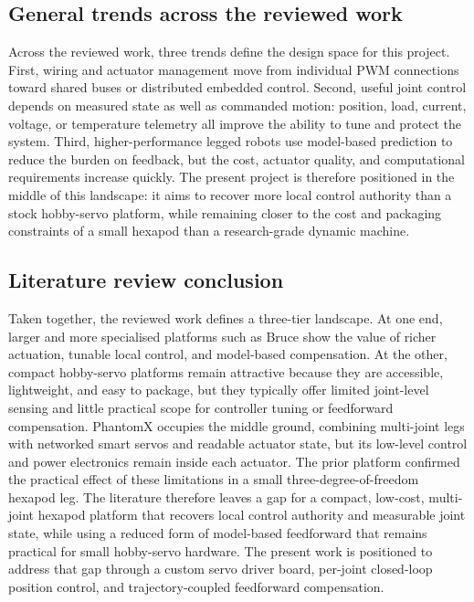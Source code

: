\subsection{General trends across the reviewed work}
Across the reviewed work, three trends define the design space for this project. First, wiring and actuator management move from individual PWM connections toward shared buses or distributed embedded control. Second, useful joint control depends on measured state as well as commanded motion: position, load, current, voltage, or temperature telemetry all improve the ability to tune and protect the system. Third, higher-performance legged robots use model-based prediction to reduce the burden on feedback, but the cost, actuator quality, and computational requirements increase quickly. The present project is therefore positioned in the middle of this landscape: it aims to recover more local control authority than a stock hobby-servo platform, while remaining closer to the cost and packaging constraints of a small hexapod than a research-grade dynamic machine.

\subsection{Literature review conclusion}
Taken together, the reviewed work defines a three-tier landscape. At one end, larger and more specialised platforms such as Bruce show the value of richer actuation, tunable local control, and model-based compensation. At the other, compact hobby-servo platforms remain attractive because they are accessible, lightweight, and easy to package, but they typically offer limited joint-level sensing and little practical scope for controller tuning or feedforward compensation. PhantomX occupies the middle ground, combining multi-joint legs with networked smart servos and readable actuator state, but its low-level control and power electronics remain inside each actuator. The prior platform confirmed the practical effect of these limitations in a small three-degree-of-freedom hexapod leg. The literature therefore leaves a gap for a compact, low-cost, multi-joint hexapod platform that recovers local control authority and measurable joint state, while using a reduced form of model-based feedforward that remains practical for small hobby-servo hardware. The present work is positioned to address that gap through a custom servo driver board, per-joint closed-loop position control, and trajectory-coupled feedforward compensation.


